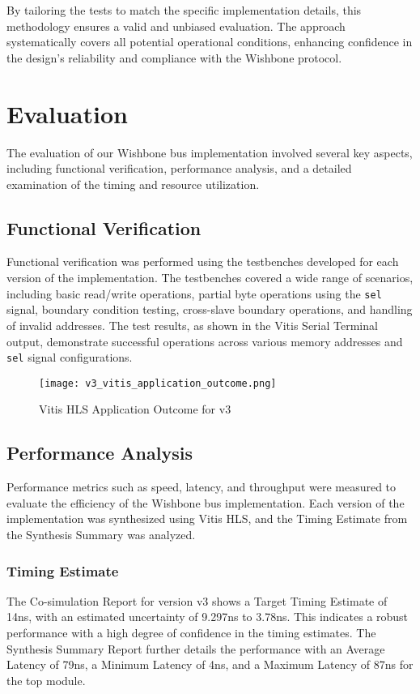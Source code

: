 \documentclass[conference]{IEEEtran}
\begin{document}
By tailoring the tests to match the specific implementation details, this methodology ensures a valid and unbiased evaluation. The approach systematically covers all potential operational conditions, enhancing confidence in the design's reliability and compliance with the Wishbone protocol.






\section{Evaluation}

The evaluation of our Wishbone bus implementation involved several key aspects, including functional verification, performance analysis, and a detailed examination of the timing and resource utilization.

\subsection{Functional Verification}
Functional verification was performed using the testbenches developed for each version of the implementation. The testbenches covered a wide range of scenarios, including basic read/write operations, partial byte operations using the \texttt{sel} signal, boundary condition testing, cross-slave boundary operations, and handling of invalid addresses. The test results, as shown in the Vitis Serial Terminal output, demonstrate successful operations across various memory addresses and \texttt{sel} signal configurations.

\begin{figure}[h]
    \centering
    \texttt{[image: v3\_vitis\_application\_outcome.png]}
    \caption{Vitis HLS Application Outcome for v3}
    \label{fig:v3_vitis_application_outcome}
\end{figure}

\subsection{Performance Analysis}
Performance metrics such as speed, latency, and throughput were measured to evaluate the efficiency of the Wishbone bus implementation. Each version of the implementation was synthesized using Vitis HLS, and the Timing Estimate from the Synthesis Summary was analyzed.

\subsubsection{Timing Estimate}
The Co-simulation Report for version v3 shows a Target Timing Estimate of 14ns, with an estimated uncertainty of 9.297ns to 3.78ns. This indicates a robust performance with a high degree of confidence in the timing estimates. The Synthesis Summary Report further details the performance with an Average Latency of 79ns, a Minimum Latency of 4ns, and a Maximum Latency of 87ns for the top module.
\end{document}
